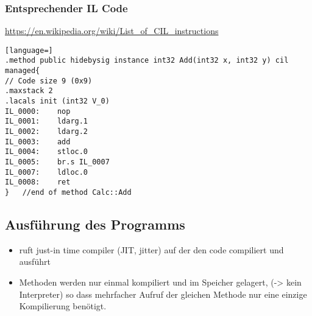 \subsubsection{Entsprechender IL Code}

\url{https://en.wikipedia.org/wiki/List_of_CIL_instructions}

\begin{lstlisting}[language=]
.method public hidebysig instance int32 Add(int32 x, int32 y) cil managed{
// Code size 9 (0x9)
.maxstack 2
.lacals init (int32 V_0)
IL_0000:	nop
IL_0001:	ldarg.1
IL_0002:	ldarg.2
IL_0003:	add
IL_0004:	stloc.0
IL_0005:	br.s IL_0007
IL_0007:	ldloc.0
IL_0008:	ret
}	//end of method Calc::Add
\end{lstlisting}


\subsection{Ausführung des Programms}

\begin{itemize}
\item ruft just-in time compiler (JIT, jitter) auf der den code compiliert und ausführt
\item Methoden werden nur einmal kompiliert und im Speicher gelagert, (-{\textgreater} kein Interpreter) so dass mehrfacher Aufruf der gleichen Methode nur eine einzige Kompilierung benötigt. 
\end{itemize}
~

